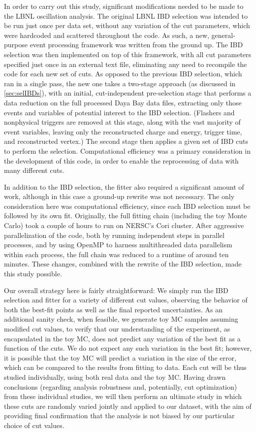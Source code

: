 \documentclass[../thesis.tex]{subfiles}
\begin{document}
In order to carry out this study, significant modifications needed to be made to the LBNL oscillation analysis. The original LBNL IBD selection was intended to be run just once per data set, without any variation of the cut parameters, which were hardcoded and scattered throughout the code. As such, a new, general-purpose event processing framework was written from the ground up. The IBD selection was then implemented on top of this framework, with all cut parameters specified just once in an external text file, eliminating any need to recompile the code for each new set of cuts. As opposed to the previous IBD selection, which ran in a single pass, the new one takes a two-stage approach (as discussed in \autoref{sec:selIBDs}), with an initial, cut-independent pre-selection stage that performs a data reduction on the full processed Daya Bay data files, extracting only those events and variables of potential interest to the IBD selection. (Flashers and nonphysical triggers are removed at this stage, along with the vast majority of event variables, leaving only the reconstructed charge and energy, trigger time, and reconstructed vertex.) The second stage then applies a given set of IBD cuts to perform the selection. Computational efficiency was a primary consideration in the development of this code, in order to enable the reprocessing of data with many different cuts.

In addition to the IBD selection, the fitter also required a significant amount of work, although in this case a ground-up rewrite was not necessary. The only consideration here was computational efficiency, since each IBD selection must be followed by its own fit. Originally, the full fitting chain (including the toy Monte Carlo) took a couple of hours to run on NERSC's Cori cluster. After aggressive parallelization of the code, both by running independent steps in parallel processes, and by using OpenMP to harness multithreaded data parallelism within each process, the full chain was reduced to a runtime of around ten minutes. These changes, combined with the rewrite of the IBD selection, made this study possible.

Our overall strategy here is fairly straightforward: We simply run the IBD selection and fitter for a variety of different cut values, observing the behavior of both the best-fit points as well as the final reported uncertainties. As an additional sanity check, when feasible, we generate toy MC samples assuming modified cut values, to verify that our understanding of the experiment, as encapsulated in the toy MC, does not predict any variation of the best fit as a function of the cuts. We do not expect any such variation in the best fit; however, it is possible that the toy MC will predict a variation in the size of the error, which can be compared to the results from fitting to data. Each cut will be thus studied individually, using both real data and the toy MC\@. Having drawn conclusions (regarding analysis robustness and, potentially, cut optimization) from these individual studies, we will then perform an ultimate study in which these cuts are randomly varied jointly and applied to our dataset, with the aim of providing final confirmation that the analysis is not biased by our particular choice of cut values.
\end{document}
